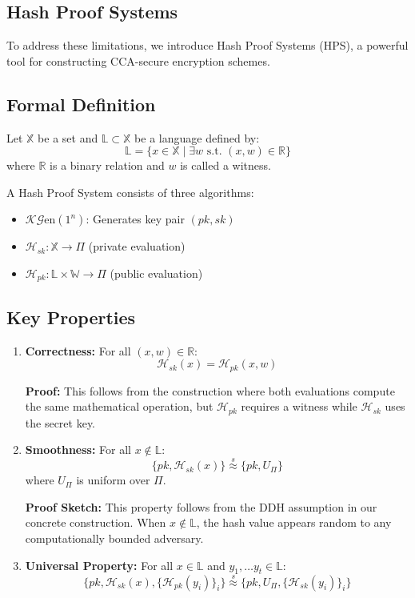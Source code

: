 \subsection{Hash Proof Systems}

To address these limitations, we introduce Hash Proof Systems (HPS), a powerful tool for constructing CCA-secure encryption schemes.

\subsection{Formal Definition}

Let $\mathbb{X}$ be a set and $\mathbb{L} \subset \mathbb{X}$ be a language defined by:
\[ \mathbb{L} = \{x \in \mathbb{X} \mid \exists w \text{ s.t. } (x,w) \in \mathbb{R}\} \]
where $\mathbb{R}$ is a binary relation and $w$ is called a witness.

A Hash Proof System consists of three algorithms:
\begin{itemize}
    \item $\mathcal{K}\mathcal{G}\text{en}(1^n)$: Generates key pair $(pk, sk)$
    \item $\mathcal{H}_{sk}: \mathbb{X} \rightarrow \Pi$ (private evaluation)
    \item $\mathcal{H}_{pk}: \mathbb{L} \times \mathbb{W} \rightarrow \Pi$ (public evaluation)
\end{itemize}

\subsection{Key Properties}

\begin{enumerate}
    \item \textbf{Correctness:} For all $(x,w) \in \mathbb{R}$:
    \[ \mathcal{H}_{sk}(x) = \mathcal{H}_{pk}(x,w) \]
    
    \textbf{Proof:}
    This follows from the construction where both evaluations compute the same mathematical operation, but $\mathcal{H}_{pk}$ requires a witness while $\mathcal{H}_{sk}$ uses the secret key.

    \item \textbf{Smoothness:} For all $x \not\in \mathbb{L}$:
    \[ \{pk, \mathcal{H}_{sk}(x)\} \stackrel{s}{\approx} \{pk, U_\Pi\} \]
    where $U_\Pi$ is uniform over $\Pi$.
    
    \textbf{Proof Sketch:}
    This property follows from the DDH assumption in our concrete construction. When $x \not\in \mathbb{L}$, the hash value appears random to any computationally bounded adversary.

    \item \textbf{Universal Property:} For all $x \in \mathbb{L}$ and $y_1, \ldots y_t \in \mathbb{L}$:
    \[ \{pk, \mathcal{H}_{sk}(x), \{\mathcal{H}_{pk}(y_i)\}_i\} \stackrel{s}{\approx} \{pk, U_\Pi, \{\mathcal{H}_{sk}(y_i)\}_i\} \]
\end{enumerate}

